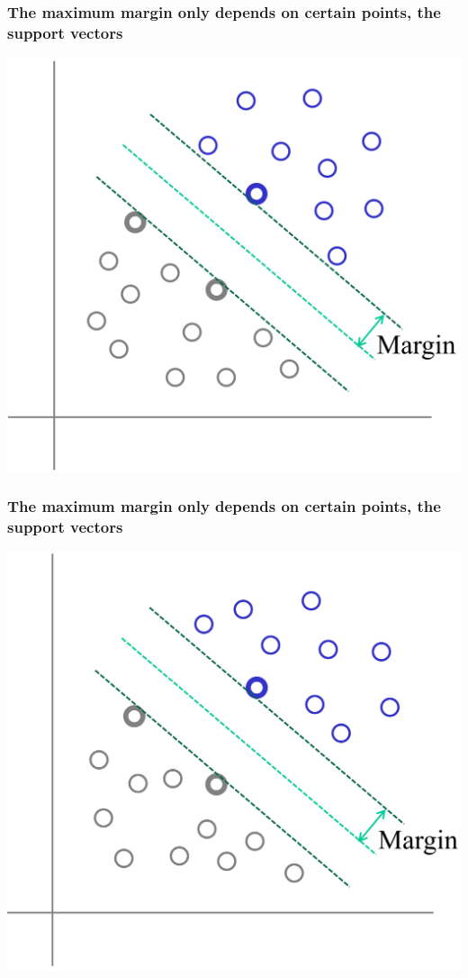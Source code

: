 \documentclass[12pt,notes,mathserif]{beamer}
\begin{document}
\begin{frame}[c]
	\frametitle{The maximum margin only depends on certain points, the support vectors}
	\begin{center}
		\includegraphics[width=0.7\linewidth]{fig8/lec88.jpg}
	\end{center}
\end{frame}

\begin{frame}[c]
	\frametitle{The maximum margin only depends on certain points, the support vectors}
	\begin{center}
		\includegraphics[width=0.7\linewidth]{fig8/lec89.jpg}
	\end{center}
\end{frame}
\end{document}
